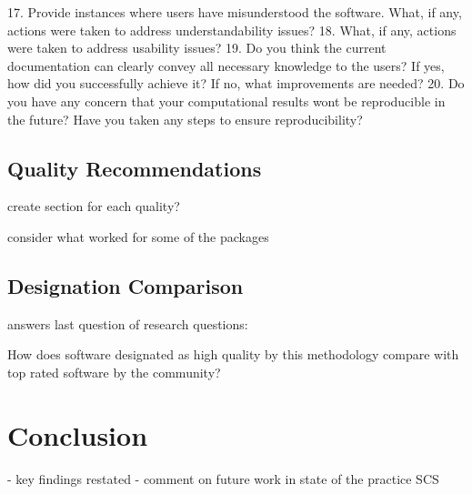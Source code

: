 \documentclass[12pt, notitlepage]{article}
\begin{document}
17. Provide instances where users have misunderstood the software. What, if any, actions
were taken to address understandability issues?
18. What, if any, actions were taken to address usability issues?
19. Do you think the current documentation can clearly convey all necessary knowledge to
the users? If yes, how did you successfully achieve it? If no, what improvements are
needed?
20. Do you have any concern that your computational results wont be reproducible in the
future? Have you taken any steps to ensure reproducibility?



\subsection{Quality Recommendations}\label{qualityrecommentations}

create section for each quality?

consider what worked for some of the packages

\subsection{Designation Comparison}

answers last question of research questions:

How does software designated as high quality by this methodology compare	with top rated software by the community?


\newpage
\section{Conclusion}

- key findings restated
- comment on future work in state of the practice SCS

\newpage
\end{document}

